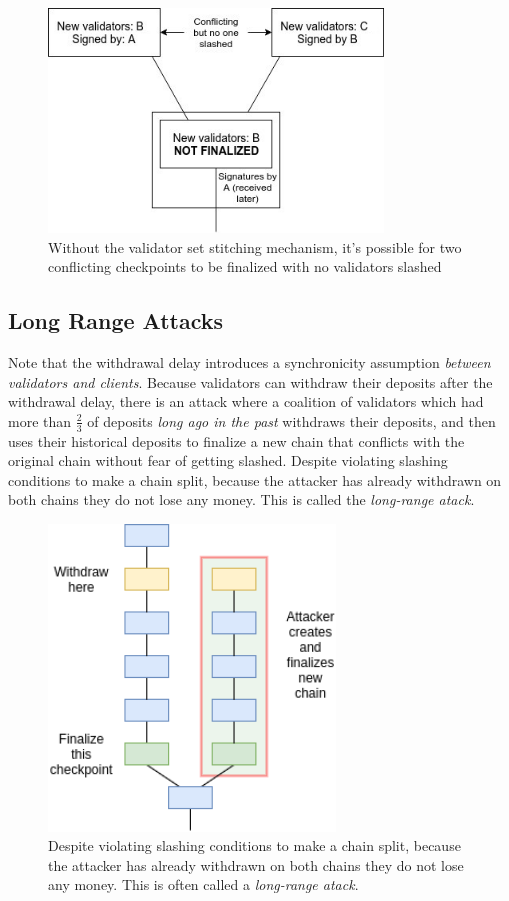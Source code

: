 \documentclass[12pt, final]{article}
\begin{document}
\begin{figure}[h!tb]
\centering
\includegraphics[width=3.5in]{validator_set_misalignment.png}
\caption{Without the validator set stitching mechanism, it's possible for two conflicting checkpoints to be finalized with no validators slashed}
\label{fig:dynamic2}
\end{figure}

\subsection{Long Range Attacks}

Note that the withdrawal delay introduces a synchronicity assumption \textit{between validators and clients}. Because validators can withdraw their deposits after the withdrawal delay, there is an attack where a coalition of validators which had more than $\frac{2}{3}$ of deposits \textit{long ago in the past} withdraws their deposits, and then uses their historical deposits to finalize a new chain that conflicts with the original chain without fear of getting slashed. Despite violating slashing conditions to make a chain split, because the attacker has already withdrawn on both chains they do not lose any money. This is called the \textit{long-range atack}.

\begin{figure}
\centering
\includegraphics[width=3in]{LongRangeAttacks.png}
\caption{Despite violating slashing conditions to make a chain split, because the attacker has already withdrawn on both chains they do not lose any money. This is often called a \textit{long-range atack}.}
\label{fig:dynamic3}
\end{figure}
\end{document}
